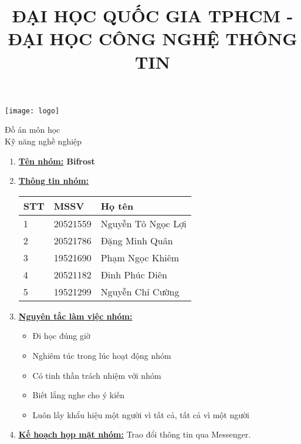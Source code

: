 \documentclass[12pt]{article}
\title{ĐẠI HỌC QUỐC GIA TPHCM - ĐẠI HỌC CÔNG NGHỆ THÔNG TIN}
\begin{document}
	\maketitle
	\begin{center}
		\texttt{[image: logo]}
	\end{center}
	\vspace{1\baselineskip}
	\begin{center}
		\Large Đồ án môn học
		\\Kỹ năng nghề nghiệp
	\end{center}
	\pagebreak
	
	\begin{enumerate}
		\item \textbf{\uline{Tên nhóm:} Bifrost}
		
		\item \textbf{\uline{Thông tin nhóm:}}\\
		\begin{table}[H]
			\begin{adjustbox}{max width=\textwidth}
				\begin{tabular}{|p{1.8cm}|p{4.60cm}|p{7.50cm}|}
					\hline
					\textbf{STT} & \textbf{MSSV} & \textbf{Họ tên} \\
					\hline
					1 & 20521559 & Nguyễn Tô Ngọc Lợi \\
					\hline
					2 & 20521786 & Đặng Minh Quân \\
					\hline
					3 & 19521690 & Phạm Ngọc Khiêm \\
					\hline
					4 & 20521182 & Đinh Phúc Diên \\
					\hline
					5 & 19521299 & Nguyễn Chí Cường \\
					\hline
				\end{tabular}
			\end{adjustbox}
		\end{table}		
		\item \textbf{\uline{Nguyên tắc làm việc nhóm:}}
		\begin{itemize}
			\item Đi học đúng giờ
			
			\item Nghiêm túc trong lúc hoạt động nhóm
			
			\item Có tinh thần trách nhiệm với nhóm
			
			\item Biết lắng nghe cho ý kiến
			
			\item Luôn lấy khẩu hiệu một người vì tất cả, tất cả vì một người
		\vspace{1\baselineskip}
		\end{itemize}
		\item \textbf{\uline{Kế hoạch họp mặt nhóm:}} Trao đổi thông tin qua Messenger.
		

\end{enumerate}
\end{document}
